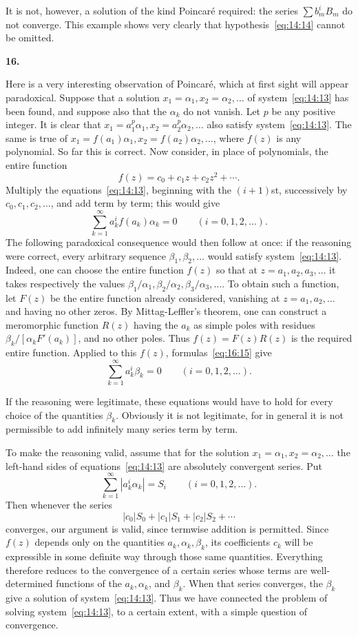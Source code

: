 \documentclass[
  paper=b5,
  fontsize=13pt,
  twoside=true,
  open=any,
  bookmarkpackage=false,
  chapterprefix=true,
  headings=normal
]{scrbook}
\theoremstyle{definition}
\newcommand{\numberedparagraph}[1]{%
  \par\medskip\phantomsection\label{sec:#1}%
  \noindent\textbf{#1.}\enspace
}
\begin{document}
It is not, however, a solution of the kind Poincar\'e required: the series $\sum b_m^iB_m$ do not converge. This example shows very clearly that hypothesis~\eqref{eq:14:14} cannot be omitted.

\numberedparagraph{16}
Here is a very interesting observation of Poincar\'e, which at first sight will appear paradoxical. Suppose that a solution $x_1=\alpha_1,x_2=\alpha_2,\ldots$ of system~\eqref{eq:14:13} has been found, and suppose also that the $\alpha_k$ do not vanish. Let $p$ be any positive integer. It is clear that $x_1=a_1^p\alpha_1,x_2=a_2^p\alpha_2,\ldots$ also satisfy system~\eqref{eq:14:13}. The same is true of $x_1=f(a_1)\alpha_1,x_2=f(a_2)\alpha_2,\ldots$, where $f(z)$ is any polynomial. So far this is correct. Now consider, in place of polynomials, the entire function
\[
  f(z)=c_0+c_1z+c_2z^2+\cdots.
\]
Multiply the equations~\eqref{eq:14:13}, beginning with the $(i+1)$st, successively by $c_0,c_1,c_2,\ldots$, and add term by term; this would give
\begin{equation}
  \sum_{k=1}^{\infty}a_k^i f(a_k)\alpha_k=0
  \qquad(i=0,1,2,\ldots).
  \tag{15}\label{eq:16:15}
\end{equation}
The following paradoxical consequence would then follow at once: if the reasoning were correct, every arbitrary sequence $\beta_1,\beta_2,\ldots$ would satisfy system~\eqref{eq:14:13}. Indeed, one can choose the entire function $f(z)$ so that at $z=a_1,a_2,a_3,\ldots$ it takes respectively the values $\beta_1/\alpha_1,\beta_2/\alpha_2,\beta_3/\alpha_3,\ldots$. To obtain such a function, let $F(z)$ be the entire function already considered, vanishing at $z=a_1,a_2,\ldots$ and having no other zeros. By Mittag-Leffler's theorem, one can construct a meromorphic function $R(z)$ having the $a_k$ as simple poles with residues $\beta_k/[\alpha_kF'(a_k)]$, and no other poles. Thus $f(z)=F(z)R(z)$ is the required entire function. Applied to this $f(z)$, formulas~\eqref{eq:16:15} give
\[
  \sum_{k=1}^{\infty}a_k^i\beta_k=0
  \qquad(i=0,1,2,\ldots).
\]

If the reasoning were legitimate, these equations would have to hold for every choice of the quantities $\beta_k$. Obviously it is not legitimate, for in general it is not permissible to add infinitely many series term by term.

To make the reasoning valid, assume that for the solution $x_1=\alpha_1,x_2=\alpha_2,\ldots$ the left-hand sides of equations~\eqref{eq:14:13} are absolutely convergent series. Put
\[
  \sum_{k=1}^{\infty}|a_k^i\alpha_k|=S_i
  \qquad(i=0,1,2,\ldots).
\]
Then whenever the series
\[
  |c_0|S_0+|c_1|S_1+|c_2|S_2+\cdots
\]
converges, our argument is valid, since termwise addition is permitted. Since $f(z)$ depends only on the quantities $a_k,\alpha_k,\beta_k$, its coefficients $c_k$ will be expressible in some definite way through those same quantities. Everything therefore reduces to the convergence of a certain series whose terms are well-determined functions of the $a_k,\alpha_k$, and $\beta_k$. When that series converges, the $\beta_k$ give a solution of system~\eqref{eq:14:13}. Thus we have connected the problem of solving system~\eqref{eq:14:13}, to a certain extent, with a simple question of convergence.
\end{document}
